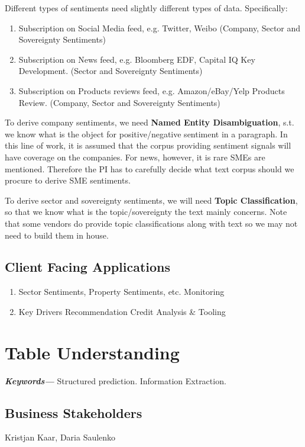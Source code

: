 \documentclass[]{article}
\providecommand{\keywords}[1]{\textbf{\textit{Keywords---}} #1}
\begin{document}
Different types of sentiments need slightly different types of data. 
Specifically:

\begin{enumerate}
    \item Subscription on Social Media feed, e.g. Twitter, Weibo (Company, 
    Sector and Sovereignty Sentiments)
    \item Subscription on News feed, e.g. Bloomberg EDF, Capital IQ Key 
    Development. (Sector and Sovereignty Sentiments)
    \item Subscription on Products reviews feed, e.g. Amazon/eBay/Yelp Products 
    Review. (Company, Sector and Sovereignty Sentiments)
\end{enumerate}

To derive company sentiments, we need \textbf{Named Entity 
Disambiguation}, s.t. we know what is the object for positive/negative 
sentiment in a paragraph. In this line of work, it is assumed that the corpus 
providing sentiment signals will have coverage on the companies. For news, 
however, it is rare SMEs are mentioned. Therefore the PI has to carefully 
decide what text corpus should we procure to derive SME sentiments.

To derive sector and sovereignty sentiments, we will 
need \textbf{Topic Classification}, so that we know what is the 
topic/sovereignty the text mainly concerns. Note that some vendors do 
provide topic classifications along with text so we may not need to build them 
in house. 

\subsection{Client Facing Applications}
\begin{enumerate}
    \item Sector Sentiments, Property Sentiments, etc.\textrightarrow 
    Monitoring
    \item Key Drivers Recommendation \textrightarrow Credit Analysis \& Tooling
\end{enumerate}


\newpage
\section{Table Understanding}

\keywords{Structured prediction. Information Extraction.}

\subsection{Business Stakeholders}
Kristjan Kaar,
Daria Saulenko
\end{document}
